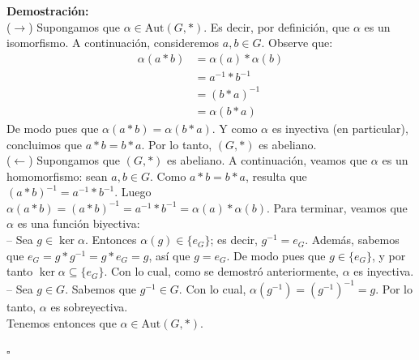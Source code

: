 \documentclass[10 pt]{article}
\begin{document}
\Large{\textbf{Demostración:} \\

($\rightarrow$) Supongamos que $\alpha \in \text{Aut}(G,*)$. Es decir, por definición, que $\alpha$ es un isomorfismo. A continuación, consideremos $a,b \in G$. Observe que:
\begin{align*}
    \alpha(a*b)&=\alpha(a)*\alpha(b) \\
    &=a^{-1}*b^{-1} \\
    &=(b*a)^{-1} \\
    &=\alpha(b*a)
\end{align*}
\Large{De modo pues que $\alpha(a*b)=\alpha(b*a)$. Y como $\alpha$ es inyectiva (en particular), concluimos que $a*b=b*a$. Por lo tanto, $(G,*)$ es abeliano.} \\

($\leftarrow$) Supongamos que $(G,*)$ es abeliano. A continuación, veamos que $\alpha$ es un homomorfismo: sean $a,b \in G$. Como $a*b=b*a$, resulta que $(a*b)^{-1}=a^{-1}*b^{-1}$. Luego $\alpha(a*b)=(a*b)^{-1}=a^{-1}*b^{-1}=\alpha(a)*\alpha(b)$. Para terminar, veamos que $\alpha$ es una función biyectiva: \\

-- Sea $g \in \ker \alpha$. Entonces $\alpha(g) \in \{e_G\}$; es decir, $g^{-1}=e_G$. Además, sabemos que $e_G=g*g^{-1}=g*e_G=g$, así que $g=e_G$. De modo pues que $g \in \{e_G\}$, y por tanto $\ker \alpha \subseteq \{e_G\}$. Con lo cual, como se demostró anteriormente, $\alpha$ es inyectiva. \\

-- Sea $g \in G$. Sabemos que $g^{-1} \in G$. Con lo cual, $\alpha(g^{-1})=(g^{-1})^{-1}=g$. Por lo tanto, $\alpha$ es sobreyectiva. \\

Tenemos entonces que $\alpha \in \text{Aut}(G,*)$.} \\

\begin{flushright}
    $\square$
\end{flushright}
\end{document}
